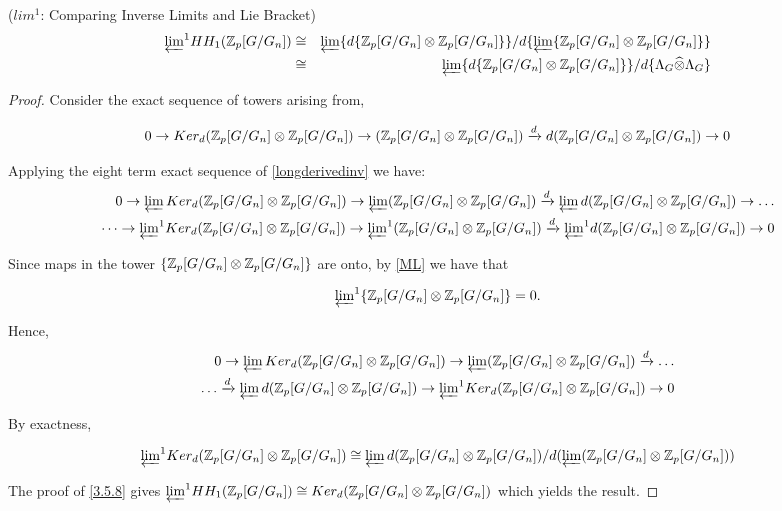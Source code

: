 \begin{proposition}($lim^1$: Comparing Inverse Limits and Lie Bracket)
\begin{eqnarray*}
{\varprojlim}^1 HH_1 (\mathbb Z_p [G/G_n]) &\cong& \varprojlim \{d \{\mathbb Z_p[G/G_n] \otimes \mathbb Z_p[G/G_n] \}\} / d \{ \varprojlim \{\mathbb Z_p[G/G_n] \otimes \mathbb Z_p[G/G_n] \}\} \\
					&\cong& \varprojlim \{d \{\mathbb Z_p[G/G_n] \otimes \mathbb Z_p[G/G_n] \}\} / d \{ \Lambda_G \widehat{\otimes} \Lambda_G \} \\
\end{eqnarray*}
\end{proposition}

\begin{proof}

Consider the exact sequence of towers arising from,

$$0 \rightarrow Ker_d(\mathbb Z_p[G/G_n] \otimes \mathbb Z_p[G/G_n]) \rightarrow (\mathbb Z_p[G/G_n] \otimes \mathbb Z_p[G/G_n])  \xrightarrow{d} d(\mathbb Z_p[G/G_n] \otimes \mathbb Z_p[G/G_n])  \rightarrow 0$$

Applying the eight term exact sequence of \ref{longderivedinv} we have:
\begin{eqnarray*}
0 \rightarrow \varprojlim Ker_d(\mathbb Z_p[G/G_n] \otimes \mathbb Z_p[G/G_n]) \rightarrow \varprojlim (\mathbb Z_p[G/G_n] \otimes \mathbb Z_p[G/G_n])  \xrightarrow{d} \varprojlim d(\mathbb Z_p[G/G_n] \otimes \mathbb Z_p[G/G_n])  \rightarrow \dots\\
\dots \rightarrow {\varprojlim}^1 Ker_d(\mathbb Z_p[G/G_n] \otimes \mathbb Z_p[G/G_n]) \rightarrow {\varprojlim}^1(\mathbb Z_p[G/G_n] \otimes \mathbb Z_p[G/G_n])  \xrightarrow{d}  {\varprojlim}^1 d(\mathbb Z_p[G/G_n] \otimes \mathbb Z_p[G/G_n])  \rightarrow 0
\end{eqnarray*}

Since maps in the tower $\{  \mathbb Z_p[G/G_n] \otimes  \mathbb Z_p[G/G_n] \}$ are onto, by \ref{ML} we have that 

$${\varprojlim}^1 \{  \mathbb Z_p[G/G_n] \otimes  \mathbb Z_p[G/G_n] \} = 0.$$ 

Hence,
\begin{eqnarray*}
0 \rightarrow \varprojlim Ker_d(\mathbb Z_p[G/G_n] \otimes \mathbb Z_p[G/G_n]) \rightarrow \varprojlim (\mathbb Z_p[G/G_n] \otimes \mathbb Z_p[G/G_n])  \xrightarrow{d}  \dots\\
\dots \xrightarrow{d} \varprojlim d(\mathbb Z_p[G/G_n] \otimes \mathbb Z_p[G/G_n])  \rightarrow {\varprojlim}^1 Ker_d(\mathbb Z_p[G/G_n] \otimes \mathbb Z_p[G/G_n]) \rightarrow 0
\end{eqnarray*}

By exactness,

$$ {\varprojlim}^1 Ker_d(\mathbb Z_p[G/G_n] \otimes \mathbb Z_p[G/G_n]) \cong  \varprojlim d(\mathbb Z_p[G/G_n] \otimes \mathbb Z_p[G/G_n])  / d(\varprojlim (\mathbb Z_p[G/G_n] \otimes \mathbb Z_p[G/G_n]))$$

The proof of \ref{3.5.8} gives  ${\varprojlim}^1 HH_1 (\mathbb Z_p [G/G_n]) \cong  Ker_d(\mathbb Z_p[G/G_n] \otimes \mathbb Z_p[G/G_n])$ which yields the result.
\end{proof}

